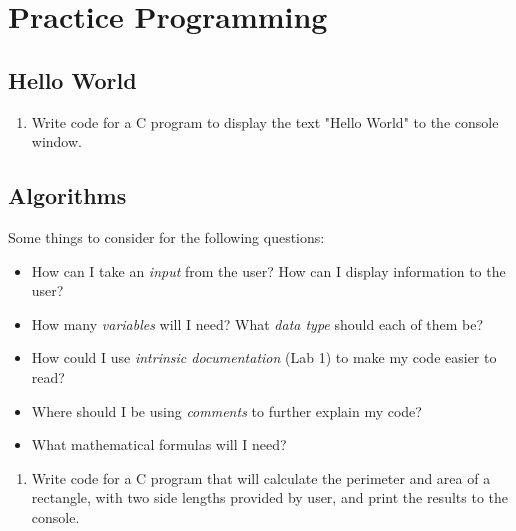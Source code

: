 \documentclass{pass}
\begin{document}
\section*{Practice Programming}
\subsection*{Hello World}
\begin{enumerate}[resume]
\item Write code for a C program to display the text "Hello World" to the console window.
\end{enumerate}

\subsection*{Algorithms}
Some things to consider for the following questions:
	\begin{itemize}
	\item How can I take an \textit{input} from the user? How can I display information to the user?
	\item How many \textit{variables} will I need? What \textit{data type} should each of them be?
	\item How could I use \textit{intrinsic documentation} (Lab 1) to make my code easier to read?
	\item Where should I be using \textit{comments} to further explain my code?
	\item What mathematical formulas will I need?\\[12pt]
	\end{itemize}
\begin{enumerate}[resume]
\item Write code for a C program that will calculate the perimeter and area of a rectangle, with two side lengths provided by user, and print the results to the console.\\[8pt]

\end{enumerate}
\end{document}
